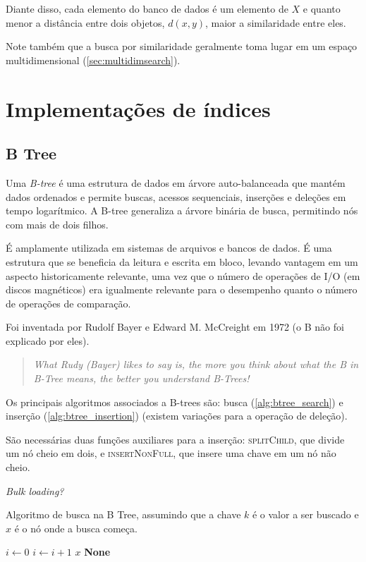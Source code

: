 Diante disso, cada elemento do banco de dados é um elemento de $X$ e quanto menor a distância entre dois objetos, $d(x, y)$, maior a similaridade entre eles.

Note também que a busca por similaridade geralmente toma lugar em um espaço multidimensional (\cref{sec:multidimsearch}).


\section{Implementações de índices}

\subsection{B Tree}

Uma \textit{B-tree} é uma estrutura de dados em árvore auto-balanceada que mantém dados ordenados e permite buscas, acessos sequenciais, inserções e deleções em tempo logarítmico. A B-tree generaliza a árvore binária de busca, permitindo nós com mais de dois filhos.

É amplamente utilizada em sistemas de arquivos e bancos de dados. É uma estrutura que se beneficia da leitura e escrita em bloco, levando vantagem em um aspecto historicamente relevante, uma vez que o número de operações de I/O (em discos magnéticos) era igualmente relevante para o desempenho quanto o número de operações de comparação.

Foi inventada por Rudolf Bayer e Edward M. McCreight em 1972 \cite{btree:bayer1970} (o B não foi explicado por eles).

\begin{quotation}
    \it What Rudy (Bayer) likes to say is, the more you think about what the B in B-Tree means, the better you understand B-Trees!
\end{quotation}

Os principais algoritmos associados a B-trees são: busca (\cref{alg:btree_search}) e inserção (\cref{alg:btree_insertion}) (existem variações para a operação de deleção).

São necessárias duas funções auxiliares para a inserção: \textsc{splitChild}, que divide um nó cheio em dois, e \textsc{insertNonFull}, que insere uma chave em um nó não cheio.

\textit{Bulk loading?}

\begin{algorithm}
\caption{Algoritmo de busca na B Tree, assumindo que a chave $k$ é o valor a ser buscado e $x$ é o nó onde a busca começa.}
\label{alg:btree_search}
\begin{algorithmic}[1]
    \State $i \gets 0$
        \State $i \gets i + 1$
    \EndWhile
        \State \Return $x$
    \EndIf
        \State \Return \textbf{None}
    \EndIf
    \State \Return {}
\EndProcedure
\end{algorithmic}
\end{algorithm}

